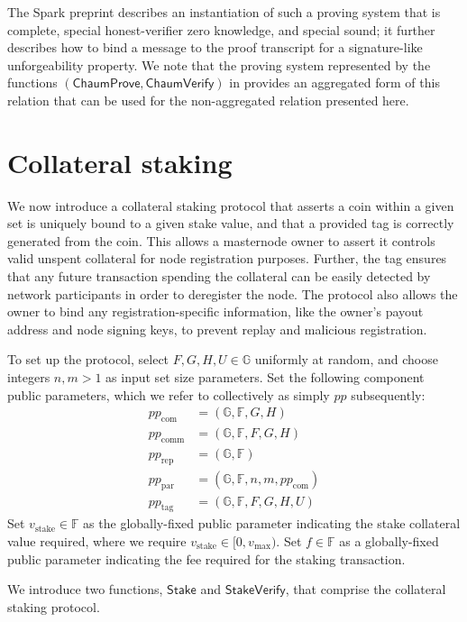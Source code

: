 \documentclass{article}
\newcommand{\G}{\mathbb{G}}
\newcommand{\F}{\mathbb{F}}
\newcommand{\func}[1]{\mathsf{#1}}
\theoremstyle{remark}
\begin{document}
The Spark preprint describes an instantiation of such a proving system that is complete, special honest-verifier zero knowledge, and special sound; it further describes how to bind a message to the proof transcript for a signature-like unforgeability property.
We note that the proving system represented by the functions $(\func{ChaumProve},\func{ChaumVerify})$ in \cite{spark} provides an aggregated form of this relation that can be used for the non-aggregated relation presented here.


\section{Collateral staking}

We now introduce a collateral staking protocol that asserts a coin within a given set is uniquely bound to a given stake value, and that a provided tag is correctly generated from the coin.
This allows a masternode owner to assert it controls valid unspent collateral for node registration purposes.
Further, the tag ensures that any future transaction spending the collateral can be easily detected by network participants in order to deregister the node.
The protocol also allows the owner to bind any registration-specific information, like the owner's payout address and node signing keys, to prevent replay and malicious registration.

To set up the protocol, select $F,G,H,U \in \G$ uniformly at random, and choose integers $n,m > 1$ as input set size parameters.
Set the following component public parameters, which we refer to collectively as simply $pp$ subsequently:
\begin{align*}
    pp_{\text{com}} &= (\G,\F,G,H) \\
    pp_{\text{comm}} &= (\G,\F,F,G,H) \\
    pp_{\text{rep}} &= (\G,\F) \\
    pp_{\text{par}} &= (\G,\F,n,m,pp_{\text{com}}) \\
    pp_{\text{tag}} &= (\G,\F,F,G,H,U)
\end{align*}
Set $v_{\text{stake}} \in \F$ as the globally-fixed public parameter indicating the stake collateral value required, where we require $v_{\text{stake}} \in [0,v_{\text{max}})$.
Set $f \in \F$ as a globally-fixed public parameter indicating the fee required for the staking transaction.

We introduce two functions, $\func{Stake}$ and $\func{StakeVerify}$, that comprise the collateral staking protocol.
\end{document}
